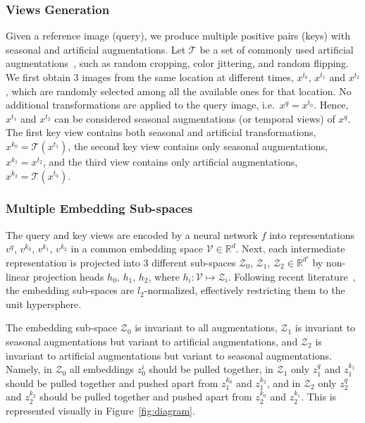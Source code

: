 \documentclass[10pt,twocolumn,letterpaper]{article}
\begin{document}
\subsubsection{Views Generation}
Given a reference image (query), we produce multiple positive pairs (keys) with seasonal and artificial augmentations. Let $\mathcal{T}$ be a set of commonly used artificial augmentations~\citep{he2020momentum}, such as random cropping, color jittering, and random flipping. We first obtain 3 images from the same location at different times, $x^{t_0}$, $x^{t_1}$ and $x^{t_2}$, which are randomly selected among all the available ones for that location. No additional transformations are applied to the query image, i.e.\ $x^q = x^{t_0}$. Hence, $x^{t_1}$ and $x^{t_2}$ can be considered seasonal augmentations (or temporal views) of $x^q$. The first key view contains both seasonal and artificial transformations, $x^{k_0} = \mathcal{T}(x^{t_1})$, the second key view contains only seasonal augmentations, $x^{k_1} = x^{t_2}$, and the third view contains only artificial augmentations, $x^{k_2} = \mathcal{T}(x^{t_0})$.

\subsubsection{Multiple Embedding Sub-spaces}
The query and key views are encoded by a neural network $f$ into representations $v^q$, $v^{k_0}$, $v^{k_1}$, $v^{k_2}$ in a common embedding space $\mathcal{V} \in \mathbb{R}^d$. Next, each intermediate representation is projected into 3 different sub-spaces $\mathcal{Z}_0$, $\mathcal{Z}_1$, $\mathcal{Z}_2 \in \mathbb{R}^{d'}$ by non-linear projection heads $h_0$, $h_1$, $h_2$, where $h_i: \mathcal{V} \mapsto \mathcal{Z}_i$. Following recent literature~\cite{wang2020understanding}, the embedding sub-spaces are $l_2$-normalized, effectively restricting them to the unit hypersphere.

The embedding sub-space $\mathcal{Z}_0$ is invariant to all augmentations, $\mathcal{Z}_1$ is invariant to seasonal augmentations but variant to artificial augmentations, and $\mathcal{Z}_2$ is invariant to artificial augmentations but variant to seasonal augmentations. Namely, in $\mathcal{Z}_0$ all embeddings $z_0^i$ should be pulled together, in $\mathcal{Z}_1$ only $z_1^q$ and $z_1^{k_1}$ should be pulled together and pushed apart from $z_1^{k_0}$ and $z_1^{k_2}$, and in $\mathcal{Z}_2$ only $z_2^q$ and $z_2^{k_2}$ should be pulled together and pushed apart from $z_2^{k_0}$ and $z_2^{k_1}$. This is represented visually in Figure~\ref{fig:diagram}.
\end{document}
